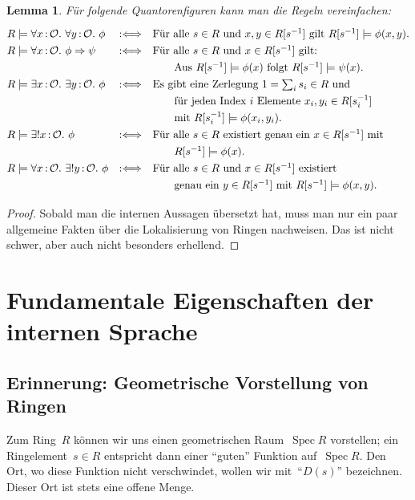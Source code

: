 \documentclass[a4paper,ngerman,12pt]{scrartcl}
\theoremstyle{definition}
\theoremstyle{plain}
\newtheorem{lemma}[defn]{Lemma}
\theoremstyle{remark}
\renewcommand{\O}{\mathcal{O}}
\DeclareMathOperator{\Spec}{Spec}
\renewcommand{\_}{\mathpunct{.}\,}
\newcommand{\?}{\,{:}\,}
\begin{document}
\begin{lemma}\label{vereinfachung}%
Für folgende Quantorenfiguren kann man die Regeln vereinfachen:
\[\renewcommand{\arraystretch}{1.3}\begin{array}{@{}lcl@{}}
  R \models \forall x\?\O\_ \forall y\?\O\_ \phi &\Ll&
    \text{Für alle~$s \in R$ und~$x,y \in R[s^{-1}]$ gilt~$R[s^{-1}] \models
    \phi(x,y)$.} \\
  R \models \forall x\?\O\_ \phi \Rightarrow \psi &\Ll&
    \text{Für alle~$s \in R$ und~$x \in R[s^{-1}]$ gilt:} \\
  &&{\quad\quad} \text{Aus $R[s^{-1}] \models \phi(x)$ folgt $R[s^{-1}] \models \psi(x)$.} \\
  R \models \exists x\?\O\_ \exists y\?\O\_ \phi &\Ll&
    \text{Es gibt eine Zerlegung~$1 = \sum_i s_i \in R$ und} \\
  &&{\quad\quad} \text{für jeden Index~$i$ Elemente~$x_i, y_i \in R[s_i^{-1}]$} \\
  &&{\quad\quad} \text{mit $R[s_i^{-1}] \models \phi(x_i,y_i)$.} \\
  R \models \exists!x \? \O\_ \phi &\Ll&
    \text{Für alle~$s \in R$ existiert genau ein~$x \in R[s^{-1}]$ mit} \\
  &&{\quad\quad} R[s^{-1}] \models \phi(x). \\
  R \models \forall x\?\O\_ \exists! y\?\O\_ \phi &\Ll&
    \text{Für alle~$s \in R$ und~$x \in R[s^{-1}]$ existiert} \\
  &&{\quad\quad} \text{genau ein~$y \in R[s^{-1}]$ mit $R[s^{-1}] \models
  \phi(x,y)$.}
\end{array}\]
\end{lemma}
\begin{proof}Sobald man die internen Aussagen übersetzt hat, muss man nur ein
paar allgemeine Fakten über die Lokalisierung von Ringen nachweisen. Das ist
nicht schwer, aber auch nicht besonders erhellend.\end{proof}


\section{Fundamentale Eigenschaften der internen Sprache}

\subsection{Erinnerung: Geometrische Vorstellung von Ringen}

Zum Ring~$R$ können wir uns einen geometrischen Raum~$\Spec R$ vorstellen; ein
Ringelement~$s \in R$ entspricht dann einer "`guten"' Funktion auf~$\Spec R$.
Den Ort, wo diese Funktion nicht verschwindet, wollen wir mit~"`$D(s)$"'
bezeichnen. Dieser Ort ist stets eine offene Menge.
\end{document}
